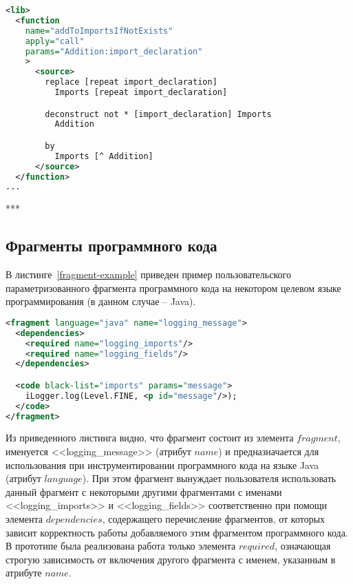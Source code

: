 \begin{lstlisting}[frame=single, language=XML, label={annotation-lib-example}, caption={Пример описания вспомогательной функции}]
<lib>
  <function
    name="addToImportsIfNotExists"
    apply="call"
    params="Addition:import_declaration"
    >
      <source>
        replace [repeat import_declaration]
          Imports [repeat import_declaration]

        deconstruct not * [import_declaration] Imports
          Addition

        by
          Imports [^ Addition]
      </source>
  </function>
...
\end{lstlisting}

***

\subsection{Фрагменты программного кода}

В листинге~\ref{fragment-example} приведен пример пользовательского параметризованного фрагмента программного кода на некотором целевом языке программирования (в данном случае -- Java).

\begin{lstlisting}[frame=single, language=XML, label={fragment-example}, caption={Пример пользовательского фрагмента}]
<fragment language="java" name="logging_message">
  <dependencies>
    <required name="logging_imports"/>
    <required name="logging_fields"/>
  </dependencies>

  <code black-list="imports" params="message">
    iLogger.log(Level.FINE, <p id="message"/>);
  </code>
</fragment>
\end{lstlisting}

Из приведенного листинга видно, что фрагмент состоит из элемента $fragment$, именуется <<logging\_message>> (атрибут $name$) и предназначается для использования при инструментировании программного кода на языке Java (атрибут $language$).
При этом фрагмент вынуждает пользователя использовать данный фрагмент с некоторыми другими фрагментами с именами <<logging\_imports>> и <<logging\_fields>> соответственно при помощи элемента $dependencies$, содержащего перечисление фрагментов, от которых зависит корректность работы добавляемого этим фрагментом программного кода.
В прототипе была реализована работа только элемента $required$, означающая строгую зависимость от включения другого фрагмента с именем, указанным в атрибуте $name$.

